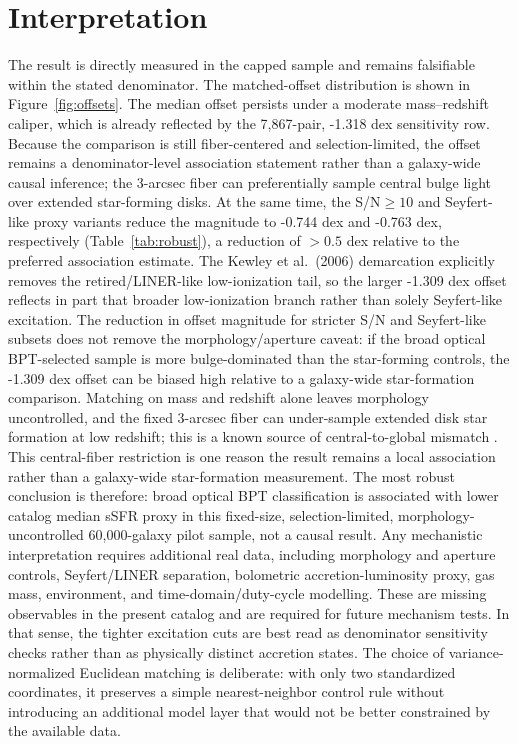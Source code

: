 \documentclass[twocolumn]{aastex631}
\begin{document}
\section{Interpretation}
The result is directly measured in the capped sample and remains falsifiable within the stated denominator. The matched-offset distribution is shown in Figure~\ref{fig:offsets}. The median offset persists under a moderate mass--redshift caliper, which is already reflected by the 7,867-pair, -1.318 dex sensitivity row. Because the comparison is still fiber-centered and selection-limited, the offset remains a denominator-level association statement rather than a galaxy-wide causal inference; the 3-arcsec fiber can preferentially sample central bulge light over extended star-forming disks. At the same time, the S/N$\geq10$ and Seyfert-like proxy variants reduce the magnitude to -0.744 dex and -0.763 dex, respectively (Table~\ref{tab:robust}), a reduction of $>0.5$ dex relative to the preferred association estimate. The Kewley et al.\ (2006) demarcation explicitly removes the retired/LINER-like low-ionization tail, so the larger -1.309 dex offset reflects in part that broader low-ionization branch rather than solely Seyfert-like excitation. The reduction in offset magnitude for stricter S/N and Seyfert-like subsets does not remove the morphology/aperture caveat: if the broad optical BPT-selected sample is more bulge-dominated than the star-forming controls, the -1.309 dex offset can be biased high relative to a galaxy-wide star-formation comparison. Matching on mass and redshift alone leaves morphology uncontrolled, and the fixed 3-arcsec fiber can under-sample extended disk star formation at low redshift; this is a known source of central-to-global mismatch \citep[e.g.,][]{harrison2017,ellison2021}. This central-fiber restriction is one reason the result remains a local association rather than a galaxy-wide star-formation measurement. The most robust conclusion is therefore: broad optical BPT classification is associated with lower catalog median sSFR proxy in this fixed-size, selection-limited, morphology-uncontrolled 60,000-galaxy pilot sample, not a causal result. Any mechanistic interpretation requires additional real data, including morphology and aperture controls, Seyfert/LINER separation, bolometric accretion-luminosity proxy, gas mass, environment, and time-domain/duty-cycle modelling. These are missing observables in the present catalog and are required for future mechanism tests. In that sense, the tighter excitation cuts are best read as denominator sensitivity checks rather than as physically distinct accretion states.
The choice of variance-normalized Euclidean matching is deliberate: with only two standardized coordinates, it preserves a simple nearest-neighbor control rule without introducing an additional model layer that would not be better constrained by the available data.
\end{document}
